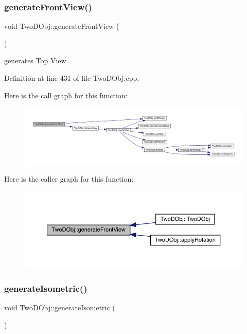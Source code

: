 \subsubsection{\texorpdfstring{generate\+Front\+View()}{generateFrontView()}}
{\footnotesize\ttfamily void Two\+D\+Obj\+::generate\+Front\+View (\begin{DoxyParamCaption}{ }\end{DoxyParamCaption})}



generates Top View 



Definition at line 431 of file Two\+D\+Obj.\+cpp.

Here is the call graph for this function\+:
\nopagebreak
\begin{figure}[H]
\begin{center}
\leavevmode
\includegraphics[width=350pt]{class_two_d_obj_a40fa2f831edda30806a28e30ae0b0feb_cgraph}
\end{center}
\end{figure}
Here is the caller graph for this function\+:
\nopagebreak
\begin{figure}[H]
\begin{center}
\leavevmode
\includegraphics[width=350pt]{class_two_d_obj_a40fa2f831edda30806a28e30ae0b0feb_icgraph}
\end{center}
\end{figure}
\mbox{\label{class_two_d_obj_a6df93c379589948f30db2eacfa5d68bb}} 
\subsubsection{\texorpdfstring{generate\+Isometric()}{generateIsometric()}}
{\footnotesize\ttfamily void Two\+D\+Obj\+::generate\+Isometric (\begin{DoxyParamCaption}{ }\end{DoxyParamCaption})}



